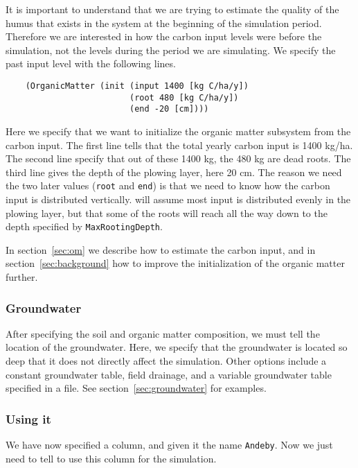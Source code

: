 \documentclass[a4paper,11pt]{article}
\begin{document}
It is important to understand that we are trying to estimate the
quality of the humus that exists in the system at the beginning of the
simulation period.  Therefore we are interested in how the carbon
input levels were before the simulation, not the levels during the
period we are simulating.  We specify the past input level with the
following lines.

\begin{verbatim}
    (OrganicMatter (init (input 1400 [kg C/ha/y])
                         (root 480 [kg C/ha/y])
                         (end -20 [cm])))
\end{verbatim}

Here we specify that we want to initialize the organic matter
subsystem from the carbon input.  The first line tells \daisy{} that the
total yearly carbon input is 1400 kg/ha.  The second line specify that
out of these 1400 kg, the 480 kg are dead roots.  The third line gives
the depth of the plowing layer, here 20 cm.  The reason we need the
two later values (\texttt{root} and \texttt{end}) is that we need to
know how the carbon input is distributed vertically.  \Daisy{} will
assume most input is distributed evenly in the plowing layer, but that
some of the roots will reach all the way down to the depth specified
by \texttt{MaxRootingDepth}.

In section~\ref{sec:om} we describe how to estimate the carbon input,
and in section~\ref{sec:background} how to improve the initialization
of the organic matter further.

\subsubsection{Groundwater}
\label{ex:groundwater}

After specifying the soil and organic matter composition, we must tell
\daisy{} the location of the groundwater.  Here, we specify that the
groundwater is located so deep that it does not directly affect the
simulation.  Other options include a constant groundwater table, field
drainage, and a variable groundwater table specified in a file.  See
section~\ref{sec:groundwater} for examples.  

\subsubsection{Using it}

We have now specified a column, and given it the name \texttt{Andeby}.
Now we just need to tell \daisy{} to use this column for the
simulation.
\end{document}
